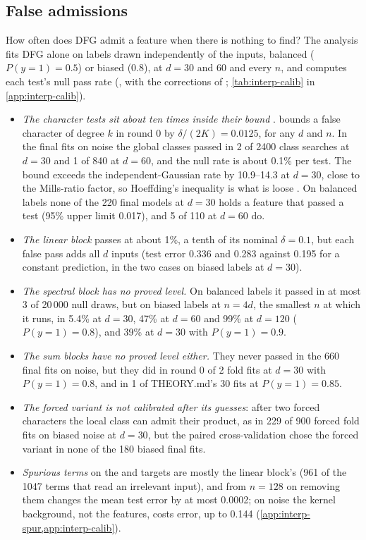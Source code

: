 \subsection{False admissions}\label{sec:interp-calib}

How often does DFG admit a feature when there is nothing to find? The analysis fits DFG alone on labels drawn independently of the inputs, balanced ($P(y{=}1)=0.5$) or biased (0.8), at $d=30$ and 60 and every $n$, and computes each test's null pass rate (, with the corrections of ; \cref{tab:interp-calib} in \cref{app:interp-calib}).
\begin{itemize}
\item \emph{The character tests sit about ten times inside their bound} .  bounds a false character of degree $k$ in round 0 by $\delta/(2K)=0.0125$, for any $d$ and $n$. In the final fits on noise the global classes passed in 2 of 2400 class searches at $d=30$ and 1 of 840 at $d=60$, and the null rate is about 0.1\% per test. The bound exceeds the independent-Gaussian rate by 10.9--14.3 at $d=30$, close to the Mills-ratio factor, so Hoeffding's inequality is what is loose . On balanced labels none of the 220 final models at $d=30$ holds a feature that passed a test (95\% upper limit 0.017), and 5 of 110 at $d=60$ do.
\item \emph{The linear block} passes at about 1\%, a tenth of its nominal $\delta=0.1$, but each false pass adds all $d$ inputs (test error 0.336 and 0.283 against 0.195 for a constant prediction, in the two cases on biased labels at $d=30$).
\item \emph{The spectral block has no proved level.} On balanced labels it passed in at most 3 of 20\,000 null draws, but on biased labels at $n=4d$, the smallest $n$ at which it runs, in 5.4\% at $d=30$, 47\% at $d=60$ and 99\% at $d=120$ ($P(y{=}1)=0.8$), and 39\% at $d=30$ with $P(y{=}1)=0.9$.
\item \emph{The sum blocks have no proved level either.} They never passed in the 660 final fits on noise, but they did in round 0 of 2 fold fits at $d=30$ with $P(y{=}1)=0.8$, and in 1 of THEORY.md's 30 fits at $P(y{=}1)=0.85$.
\item \emph{The forced variant is not calibrated after its guesses}: after two forced characters the local class can admit their product, as in 229 of 900 forced fold fits on biased noise at $d=30$, but the paired cross-validation chose the forced variant in none of the 180 biased final fits.
\item \emph{Spurious terms} on the  and  targets are mostly the linear block's (961 of the 1047 terms that read an irrelevant input), and from $n=128$ on removing them changes the mean test error by at most 0.0002; on noise the kernel background, not the features, costs error, up to 0.144 (\cref{app:interp-spur,app:interp-calib}).
\end{itemize}

